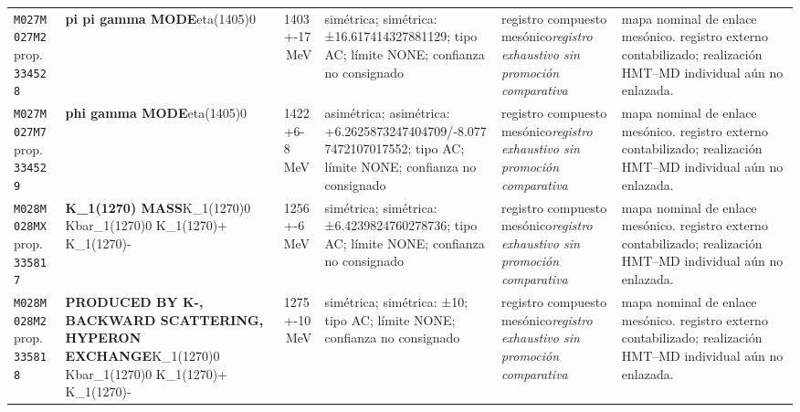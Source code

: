 \begin{landscape}
\begin{longtable}{L{1.85cm}L{4.45cm}L{2.35cm}L{4.05cm}L{3.35cm}L{7.15cm}}
\texttt{M027}\newline \texttt{M027M2}\newline prop.\ \texttt{334528} & \textbf{pi pi gamma MODE}\newline eta(1405)0 & 1403+-17\,MeV & simétrica; simétrica: ±16.617414327881129; tipo AC; límite NONE; confianza no consignado & registro compuesto mesónico\newline \emph{registro exhaustivo sin promoción comparativa} & mapa nominal de enlace mesónico. registro externo contabilizado; realización HMT--MD individual aún no enlazada. \\
\texttt{M027}\newline \texttt{M027M7}\newline prop.\ \texttt{334529} & \textbf{phi gamma MODE}\newline eta(1405)0 & 1422+6-8\,MeV & asimétrica; asimétrica: +6.2625873247404709/-8.0777472107017552; tipo AC; límite NONE; confianza no consignado & registro compuesto mesónico\newline \emph{registro exhaustivo sin promoción comparativa} & mapa nominal de enlace mesónico. registro externo contabilizado; realización HMT--MD individual aún no enlazada. \\
\texttt{M028}\newline \texttt{M028MX}\newline prop.\ \texttt{335817} & \textbf{K\_\allowbreak{}1(1270) MASS}\newline K\_\allowbreak{}1(1270)0 \textbar{}\allowbreak{} Kbar\_\allowbreak{}1(1270)0 \textbar{}\allowbreak{} K\_\allowbreak{}1(1270)+ \textbar{}\allowbreak{} K\_\allowbreak{}1(1270)- & 1256+-6\,MeV & simétrica; simétrica: ±6.4239824760278736; tipo AC; límite NONE; confianza no consignado & registro compuesto mesónico\newline \emph{registro exhaustivo sin promoción comparativa} & mapa nominal de enlace mesónico. registro externo contabilizado; realización HMT--MD individual aún no enlazada. \\
\texttt{M028}\newline \texttt{M028M2}\newline prop.\ \texttt{335818} & \textbf{PRODUCED BY K-, BACKWARD SCATTERING, HYPERON EXCHANGE}\newline K\_\allowbreak{}1(1270)0 \textbar{}\allowbreak{} Kbar\_\allowbreak{}1(1270)0 \textbar{}\allowbreak{} K\_\allowbreak{}1(1270)+ \textbar{}\allowbreak{} K\_\allowbreak{}1(1270)- & 1275+-10\,MeV & simétrica; simétrica: ±10; tipo AC; límite NONE; confianza no consignado & registro compuesto mesónico\newline \emph{registro exhaustivo sin promoción comparativa} & mapa nominal de enlace mesónico. registro externo contabilizado; realización HMT--MD individual aún no enlazada. \\

\end{longtable}
\end{landscape}
